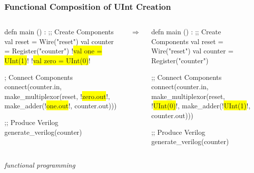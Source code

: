 \documentclass[xcolor=pdflatex,dvipsnames,table]{beamer}
\begin{document}
\begin{frame}[fragile]
\frametitle{Functional Composition of UInt Creation}
\begin{columns}
{
\begin{stanza}
defn main () :
  ;; Create Components
  val reset   = Wire("reset")
  val counter = Register("counter")
  !\colorbox{yellow}{val one     = UInt(1)}!
  !\colorbox{yellow}{val zero    = UInt(0)}!

  ; Connect Components
  connect(counter.in, 
    make_multiplexor(reset,
      !\colorbox{yellow}{zero.out}!,
      make_adder(!\colorbox{yellow}{one.out}!, counter.out)))

  ;; Produce Verilog
  generate_verilog(counter)
\end{stanza}
}
\begin{center}
$\Rightarrow$
\end{center}
{
\begin{stanza}
defn main () :
  ;; Create Components
  val reset   = Wire("reset")
  val counter = Register("counter")

  ;; Connect Components
  connect(counter.in, 
    make_multiplexor(reset,
      !\colorbox{yellow}{UInt(0)}!,
      make_adder(!\colorbox{yellow}{UInt(1)}!, counter.out)))

  ;; Produce Verilog
  generate_verilog(counter)
\end{stanza}
}
\end{columns}
\vspace{1cm}
{\it functional programming}
\end{frame}
\end{document}
